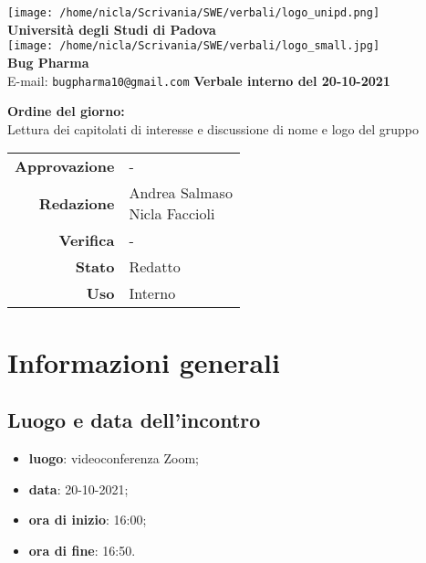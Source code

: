 \documentclass[11pt]{article}
\begin{document}
	\thispagestyle{empty}
	\begin{titlepage}
		\begin{center}
			\texttt{[image: /home/nicla/Scrivania/SWE/verbali/logo\_unipd.png]}\\
			\large \textbf{Università degli Studi di Padova} \\
			\vfill
			\texttt{[image: /home/nicla/Scrivania/SWE/verbali/logo\_small.jpg]}\\
			\large \textbf{Bug Pharma} \\
			\vfill
			\large
			E-mail: 
			\texttt{bugpharma10@gmail.com}
			\vfill
			\Huge \textbf{Verbale interno del 20-10-2021}\\
			
			\large
			
			\vfill
			\textbf{Ordine del giorno:} \\
			Lettura dei capitolati di interesse e discussione di nome e logo del gruppo
			
			
			\vfill
			
			
			\begin{tabular}{r|l}
				\textbf{Approvazione} &  -\\
				\textbf{Redazione} &  \parbox[t]{5cm}{Andrea Salmaso \\Nicla Faccioli}\\
				\textbf{Verifica} &  -\\
				\textbf{Stato} & Redatto \\
				\textbf{Uso} & Interno
			\end{tabular}
			\vfill
			
		\end{center}
	\end{titlepage}

	\section{Informazioni generali}
	\subsection{Luogo e data dell'incontro}
	\begin{itemize}
		\item \textbf{luogo}: videoconferenza Zoom;
		\item \textbf{data}: 20-10-2021;
		\item \textbf{ora di inizio}: 16:00;
		\item \textbf{ora di fine}: 16:50.
	\end{itemize}
	
\end{document}
